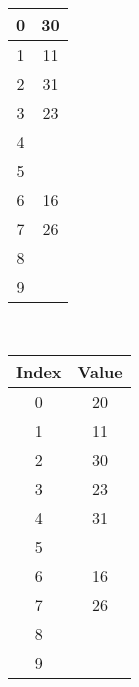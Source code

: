 \documentclass[12pt]{article}
\begin{document}
\begin{adjustwidth}{0em}{0pt}
\begin{center}
\begin{tabular}{||c | c||}
    \hline\hline
    0 & 30\\
    \hline
    1 & 11\\
    \hline
    2 & 31\\
    \hline
    3 & 23\\
    \hline
    4 &\\
    \hline
    5 &\\
    \hline
    6 & 16\\
    \hline
    7 & 26\\
    \hline
    8 &\\
    \hline
    9 &\\
    \hline
\end{tabular} \ 
\begin{tabular}{||c | c||}
	\hline
    Index & Value\\
    \hline\hline
    0 & 20\\
    \hline
    1 & 11\\
    \hline
    2 & 30\\
    \hline
    3 & 23\\
    \hline
    4 & 31\\
    \hline
    5 &\\
    \hline
    6 & 16\\
    \hline
    7 & 26\\
    \hline
    8 &\\
    \hline
    9 &\\
    \hline
\end{tabular}
\end{center}

\end{adjustwidth} 
\newpage
\end{document}
